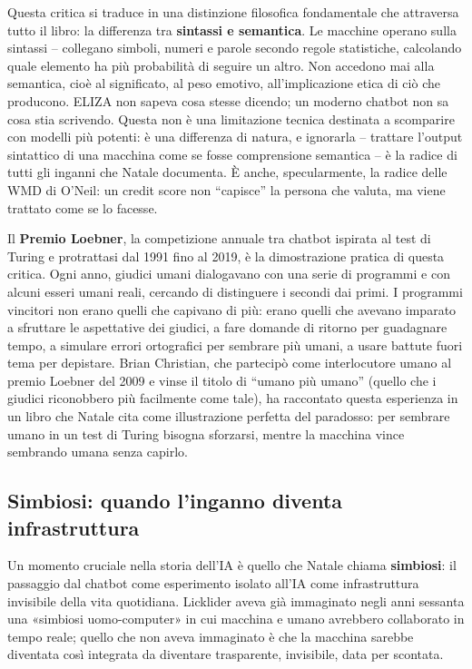 \documentclass[a4paper,11pt]{article}
\begin{document}
Questa critica si traduce in una distinzione filosofica fondamentale che attraversa tutto il libro: la differenza tra \textbf{sintassi e semantica}. Le macchine operano sulla sintassi -- collegano simboli, numeri e parole secondo regole statistiche, calcolando quale elemento ha più probabilità di seguire un altro. Non accedono mai alla semantica, cioè al significato, al peso emotivo, all'implicazione etica di ciò che producono. ELIZA non sapeva cosa stesse dicendo; un moderno chatbot non sa cosa stia scrivendo. Questa non è una limitazione tecnica destinata a scomparire con modelli più potenti: è una differenza di natura, e ignorarla -- trattare l'output sintattico di una macchina come se fosse comprensione semantica -- è la radice di tutti gli inganni che Natale documenta. È anche, specularmente, la radice delle WMD di O'Neil: un credit score non ``capisce'' la persona che valuta, ma viene trattato come se lo facesse.

Il \textbf{Premio Loebner}, la competizione annuale tra chatbot ispirata al test di Turing e protrattasi dal 1991 fino al 2019, è la dimostrazione pratica di questa critica. Ogni anno, giudici umani dialogavano con una serie di programmi e con alcuni esseri umani reali, cercando di distinguere i secondi dai primi. I programmi vincitori non erano quelli che capivano di più: erano quelli che avevano imparato a sfruttare le aspettative dei giudici, a fare domande di ritorno per guadagnare tempo, a simulare errori ortografici per sembrare più umani, a usare battute fuori tema per depistare. Brian Christian, che partecipò come interlocutore umano al premio Loebner del 2009 e vinse il titolo di ``umano più umano'' (quello che i giudici riconobbero più facilmente come tale), ha raccontato questa esperienza in un libro che Natale cita come illustrazione perfetta del paradosso: per sembrare umano in un test di Turing bisogna sforzarsi, mentre la macchina vince sembrando umana senza capirlo.

\subsection{Simbiosi: quando l'inganno diventa infrastruttura}

Un momento cruciale nella storia dell'IA è quello che Natale chiama \textbf{simbiosi}: il passaggio dal chatbot come esperimento isolato all'IA come infrastruttura invisibile della vita quotidiana. Licklider aveva già immaginato negli anni sessanta una «simbiosi uomo-computer» in cui macchina e umano avrebbero collaborato in tempo reale; quello che non aveva immaginato è che la macchina sarebbe diventata così integrata da diventare trasparente, invisibile, data per scontata.
\end{document}

